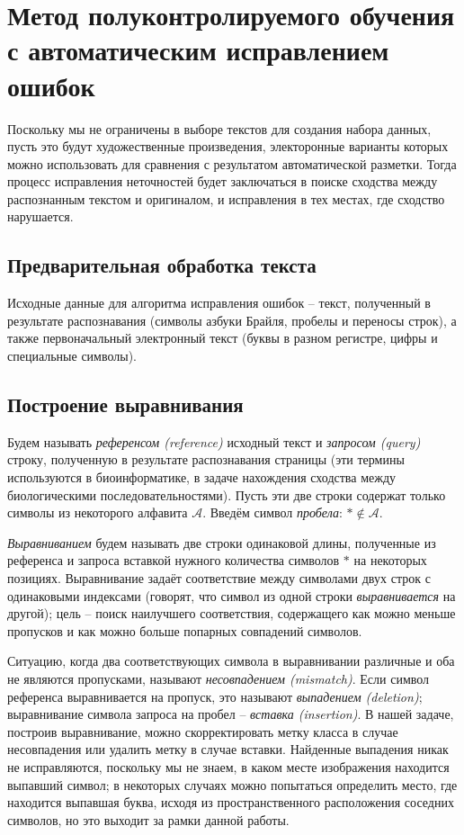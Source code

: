\documentclass{main.tex}[subfiles]
\begin{document}
\section{Метод полуконтролируемого обучения с автоматическим исправлением ошибок}

Поскольку мы не ограничены в выборе текстов для создания набора данных, пусть это будут художественные произведения, электоронные варианты которых можно использовать для сравнения с результатом автоматической разметки.
Тогда процесс исправления неточностей будет заключаться в поиске сходства между распознанным текстом и оригиналом, и исправления в тех местах, где сходство нарушается.

\subsection{Предварительная обработка текста}

Исходные данные для алгоритма исправления ошибок -- текст, полученный в результате распознавания (символы азбуки Брайля, пробелы и переносы строк), а также первоначальный электронный текст (буквы в разном регистре, цифры и специальные символы).

\subsection{Построение выравнивания}
Будем называть \emph{референсом (reference)} исходный текст и \emph{запросом (query)} строку, полученную в результате распознавания страницы (эти термины используются в биоинформатике, в задаче нахождения сходства между биологическими последовательностями).
Пусть эти две строки содержат только символы из некоторого алфавита $\mathcal A $. Введём символ \emph{пробела}: $ \ast \notin \mathcal A $.

\emph{Выравниванием} будем называть две строки одинаковой длины, полученные из референса и запроса вставкой нужного количества символов $\ast$ на некоторых позициях.
Выравнивание задаёт соответствие между символами двух строк с одинаковыми индексами (говорят, что символ из одной строки \emph{выравнивается} на другой); цель -- поиск наилучшего соответствия, содержащего как можно меньше пропусков и как можно больше попарных совпадений символов.

Ситуацию, когда два соответствующих символа в выравнивании различные и оба не являются пропусками, называют \emph{несовпадением (mismatch)}.
Если символ референса выравнивается на пропуск, это называют \emph{выпадением (deletion)}; выравнивание символа запроса на пробел -- \emph{вставка (insertion)}.
В нашей задаче, построив выравнивание, можно скорректировать метку класса в случае несовпадения или удалить метку в случае вставки.
Найденные выпадения никак не исправляются, поскольку мы не знаем, в каком месте изображения находится выпавший символ; в некоторых случаях можно попытаться определить место, где находится выпавшая буква, исходя из пространственного расположения соседних символов, но это выходит за рамки данной работы. \\
\end{document}
